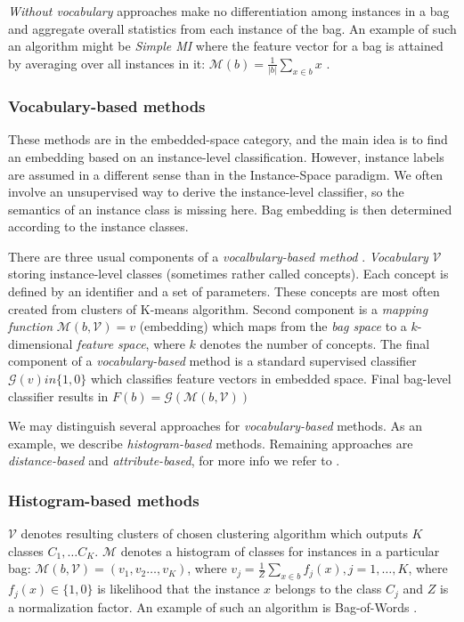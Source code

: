 \emph{Without vocabulary} approaches make no differentiation among instances in a bag and aggregate overall statistics from each instance of the bag. An example of such an algorithm might be \emph{Simple MI} where the feature vector for a bag is attained by averaging over all instances in it: $\mathcal{M}(b)=\frac{1}{|b|}\sum_{x\in b}x$ \cite{Dong2006}.

\subsubsection{Vocabulary-based methods}
These methods are in the embedded-space category, and the main idea is to find an embedding based on an instance-level classification. However, instance labels are assumed in a different sense than in the Instance-Space paradigm. We often involve an unsupervised way to derive the instance-level classifier, so the semantics of an instance class is missing here. Bag embedding is then determined according to the instance classes.

There are three usual components of a \emph{vocalbulary-based method} \cite{Amores2013}. \emph{Vocabulary} $\mathcal{V}$ storing instance-level classes (sometimes rather called concepts). Each concept is defined by an identifier and a set of parameters. These concepts are most often created from clusters of K-means algorithm. Second component is a \emph{mapping function} $\mathcal{M}(b, \mathcal{V})=v$ (embedding) which maps from the \emph{bag space} to  a $k$-dimensional \emph{feature space}, where $k$ denotes the number of concepts. The final component of a \emph{vocabulary-based} method is a standard supervised classifier $\mathcal{G}(v) in \{1,0\}$ which classifies feature vectors in embedded space. Final bag-level classifier results in $F(b)=\mathcal{G}(\mathcal{M}(b,\mathcal{V}))$

We may distinguish several approaches for \emph{vocabulary-based} methods. As an example, we describe \emph{histogram-based} methods. Remaining approaches are \emph{distance-based} and \emph{attribute-based}, for more info we refer to \cite{Amores2013}.

\subsubsection{Histogram-based methods}
$\mathcal{V}$ denotes resulting clusters of chosen clustering algorithm which outputs $K$ classes $C_1,\dots C_K$. $\mathcal{M}$ denotes a histogram of classes for instances in a particular bag: $\mathcal{M}(b,\mathcal{V})=(v_1,v_2\dots,v_K)$, where $v_j=\frac{1}{Z}\sum_{x\in b}f_{j}(x), j=1,\dots,K$, where $f_{j}(x) \in \{1,0\}$ is likelihood that the instance $x$ belongs to the class $C_j$ and $Z$ is a normalization factor. An example of such an algorithm is Bag-of-Words \cite{Nowak2006}.

